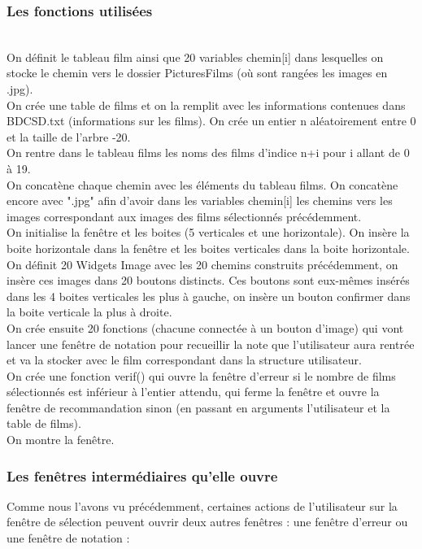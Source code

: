 \documentclass{article}
\begin{document}
\subsubsection{Les fonctions utilisées}
\noindent
\\ On définit le tableau film ainsi que 20 variables chemin[i] dans lesquelles on stocke le chemin vers le dossier PicturesFilms (où sont rangées les images en .jpg).
\noindent
\\ On crée une table de films et on la remplit avec les informations contenues dans BDCSD.txt (informations sur les films). On crée un entier n aléatoirement entre 0 et la taille de l'arbre -20.
\noindent
\\ On rentre dans le tableau films les noms des films d'indice n+i pour i allant de 0 à 19.
\noindent
\\ On concatène chaque chemin avec les éléments du tableau films. On concatène encore avec ".jpg" afin d'avoir dans les variables chemin[i] les chemins vers les images correspondant aux images des films sélectionnés précédemment.
\noindent
\\ On initialise la fenêtre et les boites (5 verticales et une horizontale). On insère la boite horizontale dans la fenêtre et les boites verticales dans la boite horizontale.
\noindent
\\ On définit 20 Widgets Image avec les 20 chemins construits précédemment, on insère ces images dans 20 boutons distincts. Ces boutons sont eux-mêmes insérés dans les 4 boites verticales les plus à gauche, on insère un bouton confirmer dans la boite verticale la plus à droite.
\noindent
\\ On crée ensuite 20 fonctions (chacune connectée à un bouton d'image) qui vont lancer une fenêtre de notation pour recueillir la note que l'utilisateur aura rentrée et va la stocker avec le film correspondant dans la structure utilisateur.
\noindent
\\ On crée une fonction verif() qui ouvre la fenêtre d'erreur si le nombre de films sélectionnés est inférieur à l'entier attendu, qui ferme la fenêtre et ouvre la fenêtre de recommandation sinon (en passant en arguments l'utilisateur et la table de films).
\noindent
\\ On montre la fenêtre.

\subsubsection{Les fenêtres intermédiaires qu'elle ouvre}
 Comme nous l'avons vu précédemment, certaines actions de l'utilisateur sur la fenêtre de sélection peuvent ouvrir deux autres fenêtres : une fenêtre d'erreur ou une fenêtre de notation :
\end{document}
